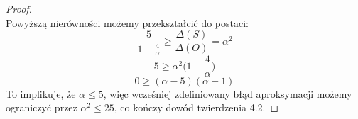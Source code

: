 \begin{proof}
\begin{equation}
    \end{equation}
    Powyższą nierówności możemy przekształcić do postaci:
    \begin{equation}
        \frac{5}{1-\frac{4}{\alpha}} \geq \frac{\Delta(S)}{\Delta(O)} = \alpha^{2}
    \end{equation}
    \begin{equation}
        5 \geq \alpha^{2} \Big(1 - \frac{4}{\alpha} \Big)
    \end{equation}
    \begin{equation}
        0 \geq (\alpha - 5)(\alpha + 1)
    \end{equation}
    To implikuje, że $\alpha \leq 5$, więc wcześniej zdefiniowany błąd aproksymacji możemy ograniczyć przez $\alpha^{2} \leq 25$, co kończy dowód twierdzenia 4.2.
\end{proof}